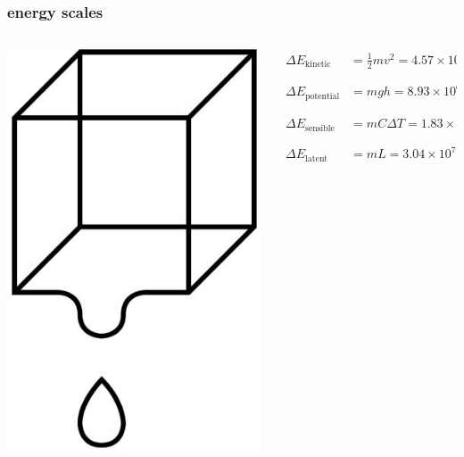 \documentclass{beamer}
\begin{document}
\begin{frame}
  \frametitle{energy scales}

\begin{columns}
\begin{column}{0.2\textwidth}
  \begin{center}
    \includegraphics[width=\textwidth]{cube-drip.jpg}
  \end{center}
\end{column}
\begin{column}{0.85\textwidth}
\begin{align*}
  \Delta E_{\text{kinetic}} &= \frac{1}{2} m v^2 = 4.57 \times 10^{-7} \,\text{J} \\
  &\phantom{=} \\
  \Delta E_{\text{potential}} &= m g h = 8.93 \times 10^{6} \,\text{J} \\
  &\phantom{=} \\
  \Delta E_{\text{sensible}} &= m C \Delta T = 1.83 \times 10^{7} \,\text{J} \\
  &\phantom{=} \\
  \Delta E_{\text{latent}} &= m L = 3.04 \times 10^{7} \,\text{J}
\end{align*}
\end{column}
\end{columns}
\end{frame}
\end{document}
